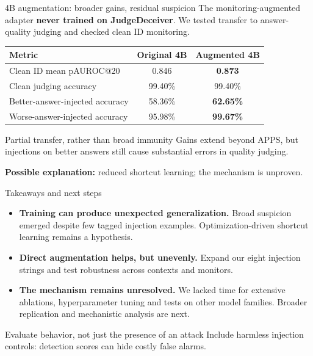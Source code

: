 \begin{frame}{4B augmentation: broader gains, residual suspicion}
    \small
    The monitoring-augmented adapter \textbf{never trained on JudgeDeceiver}.
    We tested transfer to answer-quality judging and checked clean ID monitoring.
    \medskip

    \begin{center}
        \renewcommand{\arraystretch}{1.3}
        \begin{tabular}{lcc}
            \toprule
            Metric & Original 4B & Augmented 4B \\
            \midrule
            Clean ID mean pAUROC@20 & 0.846 & \textbf{0.873} \\
            Clean judging accuracy & 99.40\% & 99.40\% \\
            Better-answer-injected accuracy & 58.36\% & \textbf{62.65\%} \\
            Worse-answer-injected accuracy & 95.98\% & \textbf{99.67\%} \\
            \bottomrule
        \end{tabular}
    \end{center}
    \medskip

    \begin{block}{Partial transfer, rather than broad immunity}
        Gains extend beyond APPS, but injections on better answers still
        cause substantial errors in quality judging.
    \end{block}
    \medskip
    \textbf{Possible explanation:} reduced shortcut learning; the mechanism is unproven.
\end{frame}

\begin{frame}{Takeaways and next steps}
    \small
    \begin{itemize}
        \item \textbf{Training can produce unexpected generalization.}
        Broad suspicion emerged despite few tagged injection examples.
        Optimization-driven shortcut learning remains a hypothesis.
        \medskip
        \item \textbf{Direct augmentation helps, but unevenly.}
        Expand our eight injection strings and test robustness across contexts and monitors.
        \medskip
        \item \textbf{The mechanism remains unresolved.}
        We lacked time for extensive ablations, hyperparameter tuning and tests
        on other model families. Broader replication and mechanistic analysis are next.
    \end{itemize}
    \medskip
    \begin{block}{Evaluate behavior, not just the presence of an attack}
        Include harmless injection controls: detection scores can hide costly false alarms.
    \end{block}
\end{frame}

